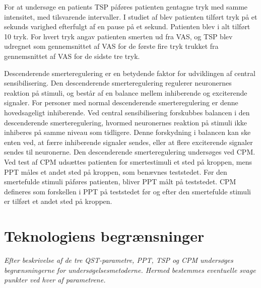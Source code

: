 For at undersøge en patients TSP påføres patienten gentagne tryk med samme intensitet, med tilsvarende intervaller. I studiet af  blev patienten tilført tryk på et sekunds varighed efterfulgt af en pause på et sekund. Patienten blev i alt tilført 10 tryk. For hvert tryk angav patienten smerten ud fra VAS, og TSP blev udregnet som gennemsnittet af VAS for de første fire tryk trukket fra gennemsnittet af VAS for de sidste tre tryk. \citep{Petersen2016}

Descenderende smerteregulering er en betydende faktor for udviklingen af central sensibilisering. Den descenderende smerteregulering regulerer neuronernes reaktion på stimuli, og består af en balance mellem inhiberende og exciterende signaler. For personer med normal descenderende smerteregulering er denne hovedsageligt inhiberende. Ved central sensibilisering forskubbes balancen i den descenderende smerteregulering, hvormed neuronernes reaktion på stimuli ikke inhiberes på samme niveau som tidligere. Denne forskydning i balancen kan ske enten ved, at færre inhiberende signaler sendes, eller at flere exciterende signaler sendes til neuronerne. \citep{Arendt-Nielsen2015b} Den descenderende smerteregulering undersøges ved CPM. Ved test af CPM udsættes patienten for smertestimuli et sted på kroppen, mens PPT måles et andet sted på kroppen, som benævnes teststedet. Før den smertefulde stimuli påføres patienten, bliver PPT målt på teststedet. \citep{Petersen2016} CPM defineres som forskellen i PPT på teststedet før og efter den smertefulde stimuli er tilført et andet sted på kroppen. \citep{Petersen2015} 

\section{Teknologiens begrænsninger}
\textit{Efter beskrivelse af de tre QST-parametre, PPT, TSP og CPM undersøges begrænsningerne for undersøgelsesmetoderne. Hermed bestemmes eventuelle svage punkter ved hver af parametrene.}

